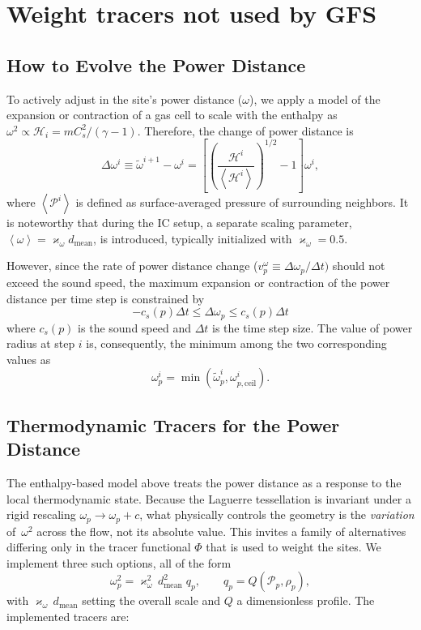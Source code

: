 \documentclass[twocolumn]{aastex63}
\newcommand{\pressure}[0]{\mathcal{P}}
\begin{document}
\section{Weight tracers not used by GFS}
\subsection{How to Evolve the Power Distance}
To actively adjust in the site's {power distance} ($\omega$), we apply a model of the expansion or contraction of a gas cell to scale with the enthalpy as $\omega^2 \propto \mathcal{H}_i =mC_s^2/(\gamma-1)$. Therefore, the change of power distance is
\begin{equation}
	\Delta\omega^{i} \equiv \tilde\omega^{i+1}-\omega^{i} = \left[ \left( \frac{\mathcal{H}^{i}}{\left<\mathcal{H}^i\right>}\right)^{1/2} -1\right] \omega^{i},
\end{equation}
where $\left<\pressure^i\right>$ is defined as surface-averaged pressure of surrounding neighbors. It is noteworthy that during the IC setup, a separate scaling parameter, $\left<\omega\right> = \varkappa_\omega d_\textrm{mean}$, is introduced, typically initialized with $\varkappa_\omega=0.5$.

However, since the rate of power distance change ($v_p^\omega \equiv\Delta\omega_p/\Delta t)$ should not exceed the sound speed, the maximum expansion or contraction of the power distance per time step is constrained by 
\begin{equation}
	-c_s(p) \Delta t \le \Delta \omega_p \leq c_s(p) \Delta t
\end{equation}
where $c_s(p)$ is the sound speed and $\Delta t$ is the time step size. The value of power radius at step $i$ is, consequently, the minimum among the two corresponding values as
\begin{equation}
	\omega^i_p = \min \left( \tilde\omega^i_p, \omega_{p,\textrm{ceil}}^i\right).
\end{equation}


\subsection{Thermodynamic Tracers for the Power Distance}
\label{sec:w2modes}
The enthalpy-based model above treats the power distance as a response to
the local thermodynamic state. Because the Laguerre tessellation is
invariant under a rigid rescaling $\omega_p\to\omega_p+c$, what physically
controls the geometry is the \emph{variation} of~$\omega^2$ across the
flow, not its absolute value.  This invites a family of alternatives
differing only in the tracer functional $\Phi$ that is used to weight the
sites.  We implement three such options, all of the form
\begin{equation}
  \omega_p^2 = \varkappa_\omega^2\, d_\textrm{mean}^2 \; q_p, \qquad
  q_p = Q\!\left(\pressure_p,\rho_p\right),
  \label{omega_tracer}
\end{equation}
with $\varkappa_\omega\,d_\textrm{mean}$ setting the overall scale and
$Q$ a dimensionless profile.  The implemented tracers are:
\end{document}
